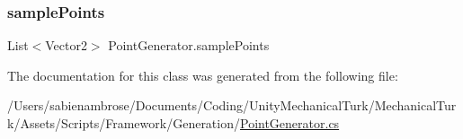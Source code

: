 \subsubsection{\texorpdfstring{sample\+Points}{samplePoints}}
{\footnotesize\ttfamily List$<$Vector2$>$ Point\+Generator.\+sample\+Points}



The documentation for this class was generated from the following file\+:\begin{DoxyCompactItemize}
\item 
/\+Users/sabienambrose/\+Documents/\+Coding/\+Unity\+Mechanical\+Turk/\+Mechanical\+Turk/\+Assets/\+Scripts/\+Framework/\+Generation/\mbox{\hyperlink{_point_generator_8cs}{Point\+Generator.\+cs}}\end{DoxyCompactItemize}
